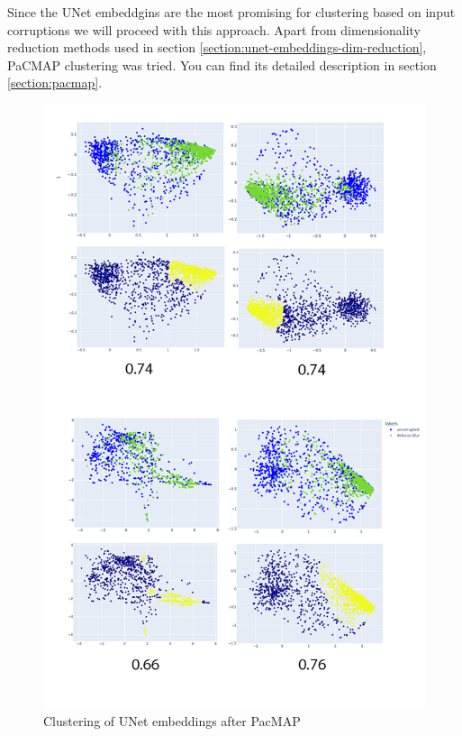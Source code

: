 Since the UNet embeddgins are the most promising for clustering based on input corruptions we will proceed with this approach. Apart from dimensionality reduction methods used in section \ref{section:unet-embeddings-dim-reduction}, PaCMAP clustering was tried. You can find its detailed description in section \ref{section:pacmap}. 
\begin{figure}[htb]
	\begin{center}
		\includegraphics[width=\linewidth]{bilder/unet-embeddings/PacMAP.png}
		\caption{Clustering of UNet embeddings after PacMAP}
		\label{fig:unet-clustering}
	\end{center}
\end{figure}

